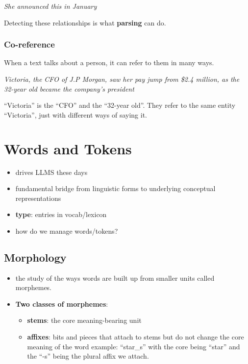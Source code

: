 \documentclass[11pt]{article}
\begin{document}
\begin{center}
	\textit{She announced this in January}
\end{center}

Detecting these relationships is what \textbf{parsing} can do.

\subsubsection{Co-reference}

When a text talks about a person, it can refer to them in many ways.

\begin{center}
	\textit{Victoria, the CFO of J.P Morgan, saw her pay jump from \$2.4
		million, as the 32-year old became the company's president}
\end{center}


``Victoria'' is the ``CFO'' and the ``32-year old''. They refer to
the same entity ``Victoria'', just with different ways of saying it.


\section{Words and Tokens}

\begin{itemize}
	\item drives LLMS these days

	\item fundamental bridge from linguistic forms to underlying conceptual
	      representations

	\item \textbf{type}: entries in vocab/lexicon

	\item how do we manage words/tokens?
\end{itemize}

\subsection{Morphology}

\begin{itemize}
	\item the study of the ways words are built up from smaller units called
	      morphemes.

	\item \textbf{Two classes of morphemes}:
	      \begin{itemize}
		      \item \textbf{stems}: the core meaning-bearing unit
		      \item \textbf{affixes}: bits and pieces that attach to stems but do
		            not change the core meaning of the word example: ``star\_s''
		            with the core being ``star'' and the ``-s'' being the plural
		            affix we attach.
	      \end{itemize}
\end{itemize}
\end{document}
